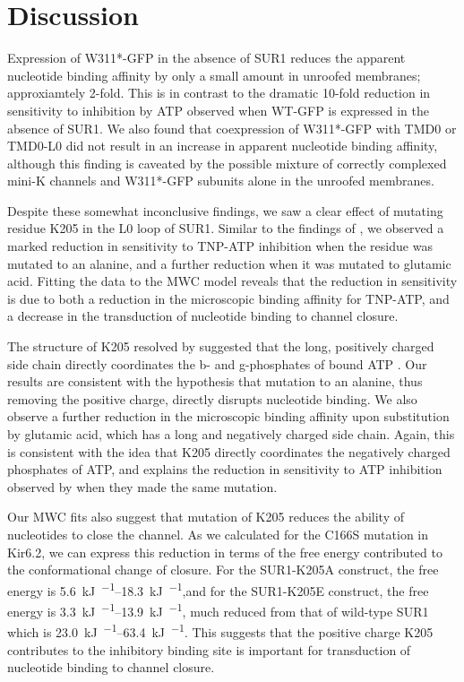 \section{Discussion}

Expression of W311*-GFP in the absence of SUR1 reduces the apparent nucleotide binding affinity by only a small amount in unroofed membranes; approxiamtely 2-fold.
This is in contrast to the dramatic 10-fold reduction in sensitivity to inhibition by ATP observed when WT-GFP is expressed in the absence of SUR1.
We also found that coexpression of W311*-GFP with TMD0 or TMD0-L0 did not result in an increase in apparent nucleotide binding affinity, although this finding is caveated by the possible mixture of correctly complexed mini-K\ATP{} channels and W311*-GFP subunits alone in the unroofed membranes.

Despite these somewhat inconclusive findings, we saw a clear effect of mutating residue K205 in the L0 loop of SUR1.
Similar to the findings of \citeauthor{ding_structural_2019}, we observed a marked reduction in sensitivity to TNP-ATP inhibition when the residue was mutated to an alanine, and a further reduction when it was mutated to glutamic acid.
Fitting the data to the MWC model reveals that the reduction in sensitivity is due to both a reduction in the microscopic binding affinity for TNP-ATP, and a decrease in the transduction of nucleotide binding to channel closure.

The structure of K205 resolved by \citeauthor{ding_structural_2019} suggested that the long, positively charged side chain directly coordinates the \textgreek{b}- and \textgreek{g}-phosphates of bound ATP \cite{ding_structural_2019}.
Our results are consistent with the hypothesis that mutation to an alanine, thus removing the positive charge, directly disrupts nucleotide binding.
We also observe a further reduction in the microscopic binding affinity upon substitution by glutamic acid, which has a long and negatively charged side chain.
Again, this is consistent with the idea that K205 directly coordinates the negatively charged phosphates of ATP, and explains the reduction in sensitivity to ATP inhibition observed by \citeauthor{pratt_engineered_2012} when they made the same mutation.

Our MWC fits also suggest that mutation of K205 reduces the ability of nucleotides to close the channel.
As we calculated for the C166S mutation in Kir6.2, we can express this reduction in terms of the free energy contributed to the conformational change of closure.
For the SUR1-K205A construct, the free energy is \SIrange{5.6}{18.3}{\kilo\joule\per\Molar},and for the SUR1-K205E construct, the free energy is \SIrange{3.3}{13.9}{\kilo\joule\per\Molar}, much reduced from that of wild-type SUR1 which is \SIrange{23.0}{63.4}{\kilo\joule\per\Molar}.
This suggests that the positive charge K205 contributes to the inhibitory binding site is important for transduction of nucleotide binding to channel closure.

